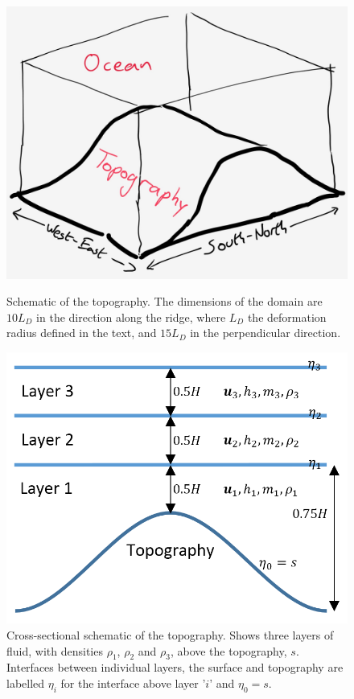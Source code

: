 \documentclass[12pt,a4paper]{report}
\begin{document}
\begin{figure}
	\centering
	\begin{minipage}[b]{0.45\linewidth}
		\includegraphics[width=\linewidth]{Topography}
		\caption{Schematic of the topography. The dimensions of the domain
			are $10 L_{D}$ in the direction along the 
			ridge, where $L_{D}$ the deformation
			radius defined in the text, and $15 L_{D}$ 
			in the perpendicular direction. }
		\label{fig:TopographySchem}
	\end{minipage}
	\quad
	\begin{minipage}[b]{0.45\linewidth}
		\includegraphics[width=\linewidth]{TopographyCross}
		\caption{ Cross-sectional schematic of the topography. 
			Shows three layers of fluid, with densities 
			$\rho_{1}$, $\rho_{2}$ and $\rho_{3}$, above the 
			topography, $s$. Interfaces between individual
			layers, the surface and topography are labelled $\eta_{i}$ for
			the interface above layer '$i$' and  $\eta_{0}=s$. }
		\label{fig:TopographyCross}
	\end{minipage}
\end{figure}
\end{document}
